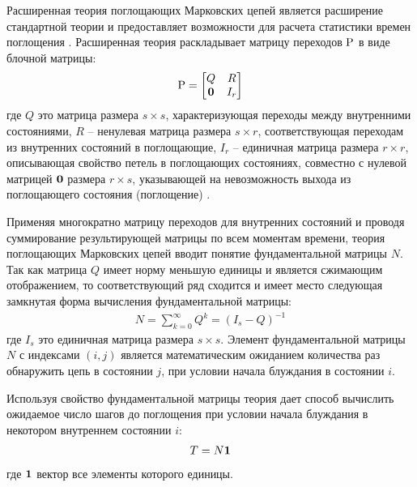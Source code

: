 Расширенная теория поглощающих Марковских цепей является расширение стандартной теории и предоставляет возможности 
для расчета статистики времен поглощения \cite{kemeny1983}. 
Расширенная теория раскладывает матрицу переходов ${\rm P}$ в виде блочной матрицы:
\begin{equation}
    \begin{aligned}
    {\rm P}=
      \begin{bmatrix}
        Q & R \\
        {\bf 0} & I_r
      \end{bmatrix}
    \label{eq:P}
    \end{aligned}
\end{equation}
где $Q$ это матрица размера $s \times s$, характеризующая переходы между внутренними состояниями, 
$R$ -- ненулевая матрица размера $s \times r$, соответствующая переходам из внутренних состояний в поглощающие, 
$I_r$ -- единичная матрица размера $r \times r$, описывающая свойство петель в поглощающих состояниях, совместно с нулевой матрицей
${\bf 0}$ размера $r \times s$, указывающей на невозможность выхода из поглощающего состояния (поглощение) \cite{kemeny1983}.

Применяя многократно матрицу переходов для внутренних состояний и проводя суммирование результирующей матрицы по всем моментам времени,
теория поглощающих Марковских цепей вводит понятие фундаментальной матрицы $N$. Так как матрица $Q$ имеет норму меньшую единицы и является сжимающим отображением,
то соответствующий ряд сходится и имеет место следующая замкнутая форма вычисления фундаментальной матрицы:
\begin{equation}
    \begin{aligned}
    N=\sum_{k=0}^{\infty} Q^k=(I_s-Q)^{-1}
    \label{eq:N}
    \end{aligned}
\end{equation}
где $I_s$ это единичная матрица размера $s \times s$. Элемент фундаментальной матрицы $N$ с индексами $(i, j)$ 
является математическим ожиданием количества раз обнаружить цепь в состоянии $j$, при условии начала блуждания в состоянии $i$.

Используя свойство фундаментальной матрицы теория дает способ вычислить ожидаемое число шагов до поглощения
при условии начала блуждания в некотором внутреннем состоянии $i$:
\begin{equation}
    \begin{aligned}
    T=N{\bf 1}
    \label{eq:T}
    \end{aligned}
\end{equation}
где ${\bf 1}$ вектор все элементы которого единицы.

